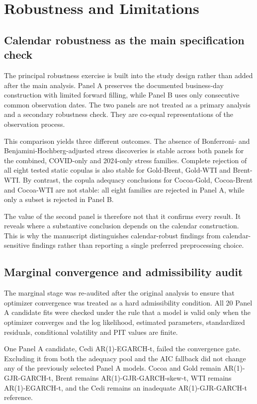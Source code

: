 \section{Robustness and Limitations}
\label{sec:robustness_and_limitations}

\subsection{Calendar robustness as the main specification check}

The principal robustness exercise is built into the study design rather than added after the main analysis. Panel A preserves the documented business-day construction with limited forward filling, while Panel B uses only consecutive common observation dates. The two panels are not treated as a primary analysis and a secondary robustness check. They are co-equal representations of the observation process.

This comparison yields three different outcomes. The absence of Bonferroni- and Benjamini-Hochberg-adjusted stress discoveries is stable across both panels for the combined, COVID-only and 2024-only stress families. Complete rejection of all eight tested static copulas is also stable for Gold-Brent, Gold-WTI and Brent-WTI. By contrast, the copula adequacy conclusions for Cocoa-Gold, Cocoa-Brent and Cocoa-WTI are not stable: all eight families are rejected in Panel A, while only a subset is rejected in Panel B.

The value of the second panel is therefore not that it confirms every result. It reveals where a substantive conclusion depends on the calendar construction. This is why the manuscript distinguishes calendar-robust findings from calendar-sensitive findings rather than reporting a single preferred preprocessing choice.

\subsection{Marginal convergence and admissibility audit}

The marginal stage was re-audited after the original analysis to ensure that optimizer convergence was treated as a hard admissibility condition. All 20 Panel A candidate fits were checked under the rule that a model is valid only when the optimizer converges and the log likelihood, estimated parameters, standardized residuals, conditional volatility and PIT values are finite.

One Panel A candidate, Cedi AR(1)-EGARCH-t, failed the convergence gate. Excluding it from both the adequacy pool and the AIC fallback did not change any of the previously selected Panel A models. Cocoa and Gold remain AR(1)-GJR-GARCH-t, Brent remains AR(1)-GJR-GARCH-skew-t, WTI remains AR(1)-EGARCH-t, and the Cedi remains an inadequate AR(1)-GJR-GARCH-t reference.

